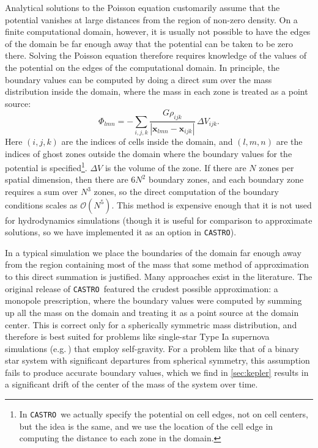 \documentclass[iop,numberedappendix]{../emulateapj}
\newcommand{\castro}{\texttt{CASTRO}}
\begin{document}
Analytical solutions to the Poisson equation customarily assume that the
potential vanishes at large distances from the region of non-zero
density. On a finite computational domain, however, it is usually not
possible to have the edges of the domain be far enough away that the
potential can be taken to be zero there. Solving the Poisson equation
therefore requires knowledge of the values of the potential on the
edges of the computational domain. In principle, the boundary values can be computed
by doing a direct sum over the mass distribution inside the domain,
where the mass in each zone is treated as a point source:
\begin{equation}
  \Phi_{{lmn}} = -\sum_{{i, j, k}} \frac{G \rho_{{ijk}}}{|\mathbf{x}_{{lmn}} - \mathbf{x}_{{ijk}}|}\, \Delta V_{{ijk}}.\label{eq:direct_sum}
\end{equation}
Here $(i, j, k)$ are the indices of cells inside the domain, and $(l,m, n)$ 
are the indices of ghost zones outside the domain where the boundary values for the potential is specified\footnote{In \castro\ we actually
specify the potential on cell edges, not on cell centers, but the idea is the same, and we use the location of
the cell edge in computing the distance to each zone in the domain.}. $\Delta V$ is the volume of the
zone. If there are $N$ zones per spatial dimension, then there are
$6 N^2$ boundary zones, and each boundary zone requires a sum over
$N^3$ zones, so the direct computation of the boundary conditions
scales as $\mathcal{O}(N^5)$.  This method is expensive enough that it is not used
for hydrodynamics simulations (though it is useful for comparison to
approximate solutions, so we have implemented it as an option in \castro).

In a typical simulation we place the boundaries of the domain far
enough away from the region containing most of the mass that some
method of approximation to this direct summation is justified. Many
approaches exist in the literature. The original release of \castro\
featured the crudest possible approximation: a monopole prescription,
where the boundary values were computed by summing up all the mass on
the domain and treating it as a point source at the domain
center. This is correct only for a spherically symmetric mass
distribution, and therefore is best suited for problems like
single-star Type Ia supernova simulations (e.g.$\ $\cite{malone:2014})
that employ self-gravity. For a problem like that of a binary star system
with significant departures from spherical symmetry, this assumption
fails to produce accurate boundary values, which we find in \autoref{sec:kepler}
results in a significant drift of the center of the mass of the system over time.
\end{document}

